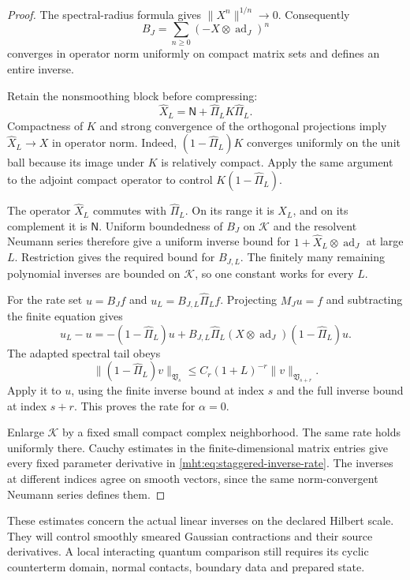 \begin{proof}
The spectral-radius formula gives
$\|X^n\|^{1/n}\to0$. Consequently
\[
 B_J=\sum_{n\geq0}(-X\otimes\operatorname{ad}_J)^n
\]
converges in operator norm uniformly on compact matrix sets and
defines an entire inverse.

Retain the nonsmoothing block before compressing:
\[
 \widehat X_L=\mathsf N+\widehat\Pi_LK\widehat\Pi_L.
\]
Compactness of $K$ and strong convergence of the orthogonal
projections imply $\widehat X_L\to X$ in operator norm.
Indeed, $(1-\widehat\Pi_L)K$ converges uniformly on the unit ball
because its image under $K$ is relatively compact. Apply the same
argument to the adjoint compact operator to control
$K(1-\widehat\Pi_L)$.

The operator $\widehat X_L$ commutes with $\widehat\Pi_L$.
On its range it is $X_L$, and on its complement it is $\mathsf N$.
Uniform boundedness of $B_J$ on $\mathcal K$ and the resolvent
Neumann series therefore give a uniform inverse bound for
$1+\widehat X_L\otimes\operatorname{ad}_J$ at large $L$.
Restriction gives the required bound for $B_{J,L}$.
The finitely many remaining polynomial inverses are bounded on
$\mathcal K$, so one constant works for every $L$.

For the rate set $u=B_Jf$ and $u_L=B_{J,L}\widehat\Pi_Lf$.
Projecting $M_Ju=f$ and subtracting the finite equation gives
\begin{equation}\label{mht:eq:staggered-Galerkin-error}
 u_L-u=-(1-\widehat\Pi_L)u
   +B_{J,L}\widehat\Pi_L(X\otimes\operatorname{ad}_J)
                            (1-\widehat\Pi_L)u.
\end{equation}
The adapted spectral tail obeys
\[
 \|(1-\widehat\Pi_L)v\|_{\mathfrak V_s}
     \leq C_r(1+L)^{-r}\|v\|_{\mathfrak V_{s+r}}.
\]
Apply it to $u$, using the finite inverse bound at index $s$ and
the full inverse bound at index $s+r$. This proves the rate for
$\alpha=0$.

Enlarge $\mathcal K$ by a fixed small compact complex neighborhood.
The same rate holds uniformly there. Cauchy estimates in the
finite-dimensional matrix entries give every fixed parameter
derivative in \eqref{mht:eq:staggered-inverse-rate}.
The inverses at different indices agree on smooth vectors, since
the same norm-convergent Neumann series defines them.
\end{proof}

These estimates concern the actual linear inverses on the declared
Hilbert scale. They will control smoothly smeared Gaussian
contractions and their source derivatives. A local interacting
quantum comparison still requires its cyclic counterterm domain,
normal contacts, boundary data and prepared state.
